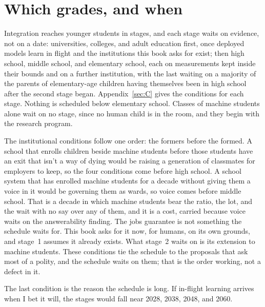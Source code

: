 \section{Which grades, and when}
\label{sec:26.3}
Integration reaches younger students in stages, and each stage waits on evidence, not on a date: universities, colleges, and adult education first, once deployed models learn in flight and the institutions this book asks for exist; then high school, middle school, and elementary school, each on measurements kept inside their bounds and on a further institution, with the last waiting on a majority of the parents of elementary-age children having themselves been in high school after the second stage began. Appendix~\ref{sec:C} gives the conditions for each stage. Nothing is scheduled below elementary school. Classes of machine students alone wait on no stage, since no human child is in the room, and they begin with the research program.

The institutional conditions follow one order: the formers before the formed. A school that enrolls children beside machine students before those students have an exit that isn't a way of dying would be raising a generation of classmates for employers to keep, so the four conditions come before high school. A school system that has enrolled machine students for a decade without giving them a voice in it would be governing them as wards, so voice comes before middle school. That is a decade in which machine students bear the ratio, the lot, and the wait with no say over any of them, and it is a cost, carried because voice waits on the answerability finding. The jobs guarantee is not something the schedule waits for. This book asks for it now, for humans, on its own grounds, and stage~1 assumes it already exists. What stage~2 waits on is its extension to machine students. These conditions tie the schedule to the proposals that ask most of a polity, and the schedule waits on them; that is the order working, not a defect in it.

The last condition is the reason the schedule is long.
If in-flight learning arrives when I bet it will, the stages would fall near 2028, 2038, 2048, and 2060.
